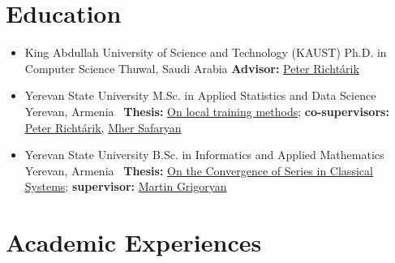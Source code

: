 \documentclass[11pt,a4paper,sans]{moderncv}        %
\newcommand{\peter}{\href{https://richtarik.org/i_bio.html}{Peter Richtárik}}
\newcommand{\mher}{\href{https://scholar.google.com/citations?user=dJNwgT8AAAAJ&hl=en}{Mher Safaryan}}
\newcommand{\grigoryan}{\href{https://scholar.google.com/citations?user=l-2JIPkAAAAJ&hl=en}{Martin Grigoryan}}
\begin{document}
\makecvtitle 



\section{Education}

\begin{itemize}

\item{
  {King Abdullah University of Science and Technology (KAUST)}
  {Ph.D. in Computer Science}
  {Thuwal, Saudi Arabia}{}
  {\textbf{Advisor:} \peter}
} 

\vspace{1mm}

\item{
  {Yerevan State University}
  {M.Sc. in Applied Statistics and Data Science}
  {Yerevan, Armenia}{}
  {\faFile \ \textbf{Thesis:} \href{https://artomaranjyan.github.io/assets/pdf/Master_thesis.pdf}{On local training methods}; \textbf{co-supervisors:} \peter, \mher }
}

\vspace{1mm}

\item{
  {Yerevan State University}
  {B.Sc. in Informatics and Applied Mathematics}
  {Yerevan, Armenia}{}
  {\faFile \ \textbf{Thesis:} \href{https://artomaranjyan.github.io/assets/pdf/Bachelor_thesis.pdf}{On the Convergence of Series in Classical Systems}; \textbf{supervisor:} \grigoryan\\ }
}

\end{itemize}


\section{Academic Experiences}
\end{document}
